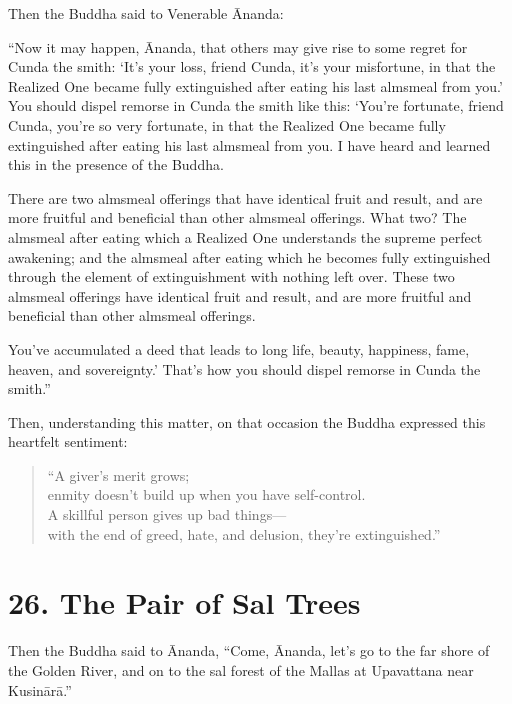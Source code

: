 \documentclass[12pt,openany]{book}%
\begin{document}
Then the Buddha said to Venerable Ānanda: 

“Now it may happen, Ānanda, that others may give rise to some regret for Cunda the smith: ‘It’s your loss, friend Cunda, it’s your misfortune, in that the Realized One became fully extinguished after eating his last almsmeal from you.’ You should dispel remorse in Cunda the smith like this: ‘You’re fortunate, friend Cunda, you’re so very fortunate, in that the Realized One became fully extinguished after eating his last almsmeal from you. I have heard and learned this in the presence of the Buddha. 

There are two almsmeal offerings that have identical fruit and result, and are more fruitful and beneficial than other almsmeal offerings. What two? The almsmeal after eating which a Realized One understands the supreme perfect awakening; and the almsmeal after eating which he becomes fully extinguished through the element of extinguishment with nothing left over. These two almsmeal offerings have identical fruit and result, and are more fruitful and beneficial than other almsmeal offerings. 

You’ve accumulated a deed that leads to long life, beauty, happiness, fame, heaven, and sovereignty.’ That’s how you should dispel remorse in Cunda the smith.” 

Then, understanding this matter, on that occasion the Buddha expressed this heartfelt sentiment: 

\begin{verse}%
“A giver’s merit grows; \\
enmity doesn’t build up when you have self-control. \\
A skillful person gives up bad things—\\
with the end of greed, hate, and delusion, they’re extinguished.” 

%
\end{verse}

\section*{26. The Pair of Sal Trees }

Then the Buddha said to Ānanda, “Come, Ānanda, let’s go to the far shore of the Golden River, and on to the sal forest of the Mallas at Upavattana near \textsanskrit{Kusinārā}.” 
\end{document}
